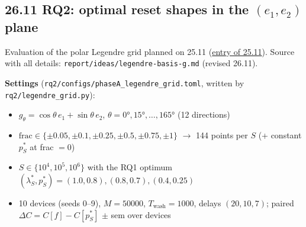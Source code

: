 \subsection*{26.11 \quad RQ2: optimal reset shapes in the $(e_1, e_2)$ plane}
\label{sec:rq2-optimal-shapes}
\begin{sloppypar}
Evaluation of the polar Legendre grid planned on 25.11 (\hyperref[sec:rq2-legendre-plan]{entry of 25.11}).
Source with all details: \texttt{report/ideas/legendre-basis-g.md} (revised 26.11).

\textbf{Settings} (\texttt{rq2/configs/phaseA\_legendre\_grid.toml}, written by \texttt{rq2/legendre\_grid.py}):
\begin{itemize}
    \item $g_\theta = \cos\theta\, e_1 + \sin\theta\, e_2$, $\theta = 0°, 15°, \ldots, 165°$ (12 directions)
    \item $\text{frac} \in \{\pm 0.05, \pm 0.1, \pm 0.25, \pm 0.5, \pm 0.75, \pm 1\}$ $\to$ 144 points per $S$
    (+ constant $p^*_S$ at frac $= 0$)
    \item $S \in \{10^4, 10^5, 10^6\}$ with the RQ1 optimum $(\lambda^*_S, p^*_S) = (1.0, 0.8), (0.8, 0.7), (0.4, 0.25)$
    \item 10 devices (seeds 0--9), $M = 50000$, $T_\text{wash} = 1000$, delays $(20, 10, 7)$; paired
    $\Delta C = C[f] - C[p^*_S]$ $\pm$ sem over devices
\end{itemize}


\end{sloppypar}
